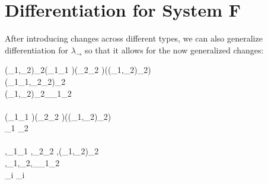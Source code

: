 \section{Differentiation for System F}
\label{sec:param-derive-changes-across-types-transform}
After introducing changes across different types, we can also generalize
differentiation for \ensuremath{\lambda_{\to}} so that it allows for the now generalized changes:
\begin{hscode}\SaveRestoreHook
{}%
%
%
%
\>[3]{}(_{1},_{2})\in \Delta_2\mean{\sigma\to \tau}\mathrel{=}\Pi (_{1}\typcolon{}_1 \mean{\sigma})\hsforall \;(_{2}\typcolon{}_2 \mean{\sigma})\;(\typcolon(_{1},_{2})\in \Delta_2\mean{\sigma})\<[E]%
\\
\>[3]{}\<[5]%
\>[5]{}(_{1}\;_{1},_{2}\;_{2})\in \Delta_2\mean{\tau}{}\<[E]%
\\
\>[3]{}(_{1},_{2})\in \Delta_2\mean{\alpha}\mathrel{=}\Delta_\alpha\;_{1}\;_{2}{}\<[E]%
\\[\blanklineskip]%
\>[3]{}\mathrel{=}\<[E]%
\\
\>[3]{}\mathrel{=}\lambda (_{1}\typcolon{}_1 \mean{\sigma})\;(_{2}\typcolon{}_2 \mean{\sigma})\;(\typcolon(_{1},_{2})\in \Delta_2\mean{\sigma})\to {}\<[E]%
\\
\>[3]{}\mathrel{=}\;_1 \;_2 \;\<[E]%
\\[\blanklineskip]%
\>[3]{}\Derive{\EmptyContext}\mathrel{=}\EmptyContext{}\<[E]%
\\
\>[3]{}\mathrel{=}\Derive{\Gamma},_{1}\typcolon{}_1 \mean{\tau},_{2}\typcolon{}_2 \mean{\tau},\typcolon(_{1},_{2})\in \Delta_2\mean{\tau}{}\<[E]%
\\
\>[3]{}\Derive{\Gamma,\alpha\typcolon\star}\mathrel{=}\Derive{\Gamma},\alpha_{1}\typcolon\star,\alpha_{2}\typcolon\star,\Delta_\alpha\typcolon\alpha_{1}\to \alpha_{2}\to \star{}\<[E]%
\\[\blanklineskip]%
\>[3]{}_i \mean{\alpha}\mathrel{=}\alpha_i{}\<[E]%
\ColumnHook
\end{hscode}\resethooks
